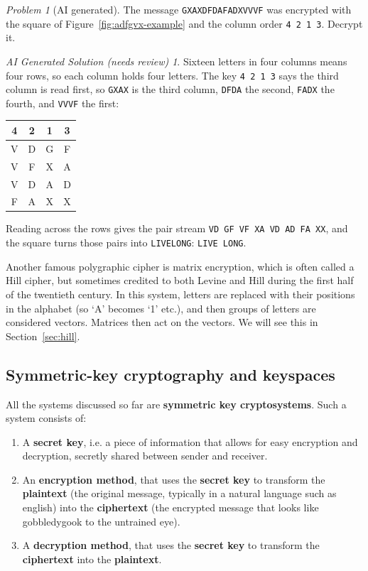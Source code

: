 \documentclass{article}
\theoremstyle{plain}
\theoremstyle{definition}
\theoremstyle{remark}
\newtheorem{problem}[theorem]{Problem}
\newtheorem*{aisolution}{AI Generated Solution (needs review)}
\numberwithin{theorem}{section}
\begin{document}
\begin{problem}[AI generated]
The message \texttt{GXAXDFDAFADXVVVF} was encrypted with the square of Figure~\ref{fig:adfgvx-example} and the column order \texttt{4 2 1 3}.  Decrypt it.
\end{problem}
\begin{aisolution}
Sixteen letters in four columns means four rows, so each column holds four letters.  The key \texttt{4 2 1 3} says the third column is read first, so \texttt{GXAX} is the third column, \texttt{DFDA} the second, \texttt{FADX} the fourth, and \texttt{VVVF} the first:
\begin{center}
\begin{tabular}{cccc}
  4 & 2 & 1 & 3 \\
  \hline
  V & D & G & F \\
  V & F & X & A \\
  V & D & A & D \\
  F & A & X & X \\
\end{tabular}
\end{center}
Reading across the rows gives the pair stream \texttt{VD GF VF XA VD AD FA XX}, and the square turns those pairs into \texttt{LIVELONG}:  \texttt{LIVE LONG}.
\end{aisolution}

Another famous polygraphic cipher is matrix encryption, which is often called a Hill cipher, but sometimes credited to both Levine and Hill during the first half of the twentieth century.  In this system, letters are replaced with their positions in the alphabet (so `A' becomes `1' etc.), and then groups of letters are considered vectors.  Matrices then act on the vectors.  We will see this in Section~\ref{sec:hill}.

\subsection{Symmetric-key cryptography and keyspaces}

All the systems discussed so far are \textbf{symmetric key cryptosystems}.  Such a system consists of:

\begin{enumerate}
	\item A \textbf{secret key}, i.e. a piece of information that allows for easy encryption and decryption, secretly shared between sender and receiver.
	\item An \textbf{encryption method}, that uses the \textbf{secret key} to transform the \textbf{plaintext} (the original message, typically in a natural language such as english) into the \textbf{ciphertext} (the encrypted message that looks like gobbledygook to the untrained eye).
	\item A \textbf{decryption method}, that uses the \textbf{secret key} to transform the \textbf{ciphertext} into the \textbf{plaintext}.
\end{enumerate}
\end{document}
